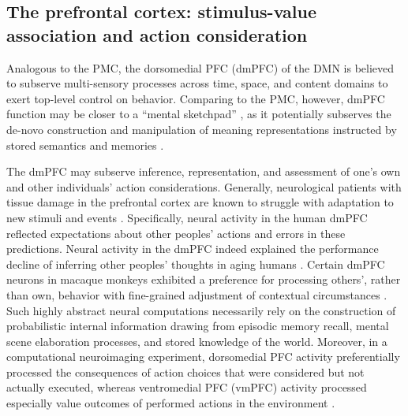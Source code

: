 \documentclass[10pt,letterpaper]{article}
\begin{document}
\subsection{The prefrontal cortex: stimulus-value association and action consideration}
Analogous to the PMC,
the dorsomedial PFC (dmPFC) of the DMN is believed to subserve
multi-sensory processes
across time, space, and content domains to
exert top-level control on behavior.
Comparing to the PMC, however,
dmPFC function may be closer to a
``mental sketchpad'' \citep{goldman1996prefrontal}, as it
potentially subserves the de-novo construction and manipulation
of meaning representations instructed by stored semantics and memories
\citep{bzdok2013segregation}.



The dmPFC may subserve inference, representation, and assessment
of one's own and other individuals' action considerations.
Generally,
neurological patients with tissue damage in the prefrontal cortex
are known to struggle with
adaptation to new stimuli and events
\citep{stuss1986frontal}.
Specifically, neural activity in the human dmPFC
reflected expectations about other peoples' actions and
errors in these predictions.
Neural activity in the dmPFC indeed explained the performance decline
of inferring other peoples' thoughts in aging humans \citep{moran2012social}.
Certain dmPFC neurons in macaque monkeys exhibited a preference
for processing others', rather than own, behavior
with fine-grained adjustment of contextual circumstances \citep{yoshida2010neural}.
%
Such highly abstract neural computations necessarily rely on the
construction of probabilistic internal information drawing from
episodic memory recall, mental scene elaboration processes,
and stored knowledge of the world.
%
Moreover,
in a computational neuroimaging experiment,
dorsomedial PFC activity preferentially processed the consequences of
action choices that were considered but not actually executed,
whereas ventromedial PFC (vmPFC) activity
processed especially value outcomes of performed actions in the environment
\citep{nicolle2012agent}.
\end{document}
